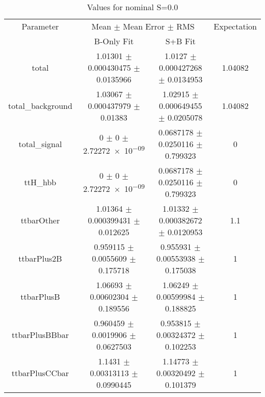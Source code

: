 \begin{table}
\centering
\caption{Values for nominal S=0.0}
\begin{tabular}{cccc}
\toprule
Parameter & \multicolumn{2}{c}{Mean $\pm$ Mean Error $\pm$ RMS} & Expectation\\
 & B-Only Fit & S+B Fit & \\
\midrule
total & \num{1.01301} $\pm$ \num{0.000430475} $\pm$ \num{0.0135966} & \num{1.0127} $\pm$ \num{0.000427268} $\pm$ \num{0.0134953} & \num{1.04082}\\
total\_background & \num{1.03067} $\pm$ \num{0.000437979} $\pm$ \num{0.01383} & \num{1.02915} $\pm$ \num{0.000649455} $\pm$ \num{0.0205078} & \num{1.04082}\\
total\_signal & \num{0} $\pm$ \num{0} $\pm$ \num{2.72272e-09} & \num{0.0687178} $\pm$ \num{0.0250116} $\pm$ \num{0.799323} & \num{0}\\
ttH\_hbb & \num{0} $\pm$ \num{0} $\pm$ \num{2.72272e-09} & \num{0.0687178} $\pm$ \num{0.0250116} $\pm$ \num{0.799323} & \num{0}\\
ttbarOther & \num{1.01364} $\pm$ \num{0.000399431} $\pm$ \num{0.012625} & \num{1.01332} $\pm$ \num{0.000382672} $\pm$ \num{0.0120953} & \num{1.1}\\
ttbarPlus2B & \num{0.959115} $\pm$ \num{0.0055609} $\pm$ \num{0.175718} & \num{0.955931} $\pm$ \num{0.00553938} $\pm$ \num{0.175038} & \num{1}\\
ttbarPlusB & \num{1.06693} $\pm$ \num{0.00602304} $\pm$ \num{0.189556} & \num{1.06249} $\pm$ \num{0.00599984} $\pm$ \num{0.188825} & \num{1}\\
ttbarPlusBBbar & \num{0.960459} $\pm$ \num{0.0019906} $\pm$ \num{0.0627503} & \num{0.953815} $\pm$ \num{0.00324372} $\pm$ \num{0.102253} & \num{1}\\
ttbarPlusCCbar & \num{1.1431} $\pm$ \num{0.00313113} $\pm$ \num{0.0990445} & \num{1.14773} $\pm$ \num{0.00320492} $\pm$ \num{0.101379} & \num{1}\\
\bottomrule
\end{tabular}
\end{table}